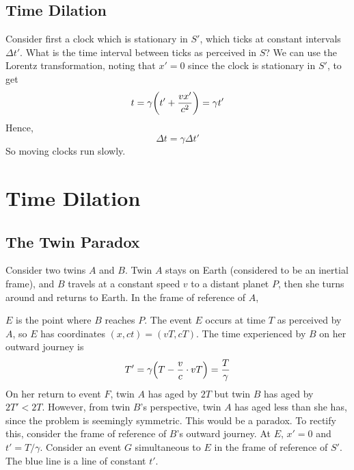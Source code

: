 \documentclass{article}
\begin{document}
\subsection{Time Dilation}
Consider first a clock which is stationary in $S'$, which ticks at constant intervals $\Delta t'$. What is the time interval between ticks as perceived in $S$? We can use the Lorentz transformation, noting that $x'=0$ since the clock is stationary in $S'$, to get
\[ t = \gamma\qty(t' + \frac{vx'}{c^2}) = \gamma t' \]
Hence,
\[ \Delta t = \gamma \Delta t' \]
So moving clocks run slowly.

\section{Time Dilation}
\subsection{The Twin Paradox}
Consider two twins $A$ and $B$. Twin $A$ stays on Earth (considered to be an inertial frame), and $B$ travels at a constant speed $v$ to a distant planet $P$, then she turns around and returns to Earth. In the frame of reference of $A$,
\begin{center}
\end{center}
$E$ is the point where $B$ reaches $P$. The event $E$ occurs at time $T$ as perceived by $A$, so $E$ has coordinates $(x, ct) = (vT, cT)$. The time experienced by $B$ on her outward journey is
\[ T' = \gamma\qty(T - \frac{v}{c}\cdot vT) = \frac{T}{\gamma} \]
On her return to event $F$, twin $A$ has aged by $2T$ but twin $B$ has aged by $2T' < 2T$. However, from twin $B$'s perspective, twin $A$ has aged less than she has, since the problem is seemingly symmetric. This would be a paradox. To rectify this, consider the frame of reference of $B$'s outward journey. At $E$, $x' = 0$ and $t' = T / \gamma$. Consider an event $G$ simultaneous to $E$ in the frame of reference of $S'$. The blue line is a line of constant $t'$.
\end{document}
